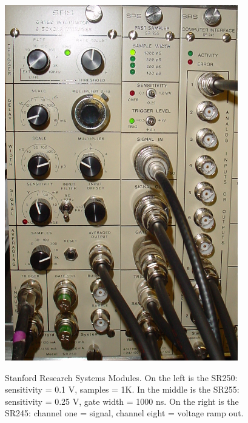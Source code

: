 \begin{figure}
\begin{center}
\leavevmode
\includegraphics[width=4in]
{boxcar/boxcar.png}\\
\end{center}
\caption[Stanford Research Systems Modules]{Stanford Research Systems Modules. On the left is the SR250: sensitivity = 0.1 V, samples = 1K. In the middle is the SR255: sensitivity = 0.25 V, gate width = 1000 ns. On the right is the SR245: channel one = signal, channel eight = voltage ramp out.}
\label{boxcar}
\end{figure} 
